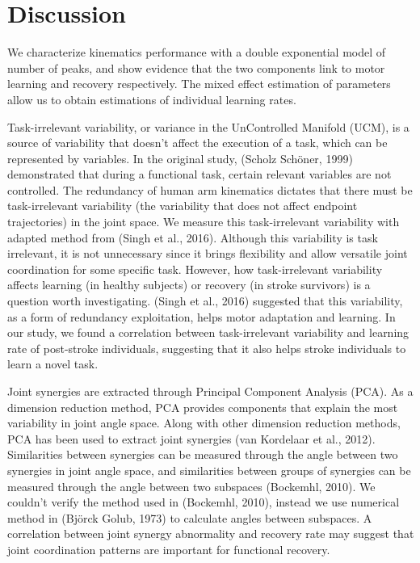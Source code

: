 \section{Discussion}
We characterize kinematics performance with a double exponential model of number of peaks, and show evidence that the two components link to motor learning and recovery respectively. 
The mixed effect estimation of parameters allow us to obtain estimations of individual learning rates.

Task-irrelevant variability, or variance in the UnControlled Manifold (UCM), is a source of variability that doesn’t affect the execution of a task, which can be represented by variables. 
In the original study, (Scholz  Schöner, 1999) demonstrated that during a functional task, certain relevant variables are not controlled.
The redundancy of human arm kinematics dictates that there must be task-irrelevant variability (the variability that does not affect endpoint trajectories) in the joint space. 
We measure this task-irrelevant variability with adapted method from (Singh et al., 2016). 
Although this variability is task irrelevant, it is not unnecessary since it brings flexibility and allow versatile joint coordination for some specific task. 
However, how task-irrelevant variability affects learning (in healthy subjects) or recovery (in stroke survivors) is a question worth investigating. 
(Singh et al., 2016) suggested that this variability, as a form of redundancy exploitation, helps motor adaptation and learning. 
In our study, we found a correlation between task-irrelevant variability and learning rate of post-stroke individuals, suggesting that it also helps stroke individuals to learn a novel task.

Joint synergies are extracted through Principal Component Analysis (PCA). 
As a dimension reduction method, PCA provides components that explain the most variability in joint angle space. 
Along with other dimension reduction methods, PCA has been used to extract joint synergies (van Kordelaar et al., 2012). 
Similarities between synergies can be measured through the angle between two synergies in joint angle space, and similarities between groups of synergies can be measured through the angle between two subspaces (Bockemhl, 2010). 
We couldn’t verify the method used in (Bockemhl, 2010), instead we use numerical method in (Björck  Golub, 1973) to calculate angles between subspaces. 
A correlation between joint synergy abnormality and recovery rate may suggest that joint coordination patterns are important for functional recovery.

